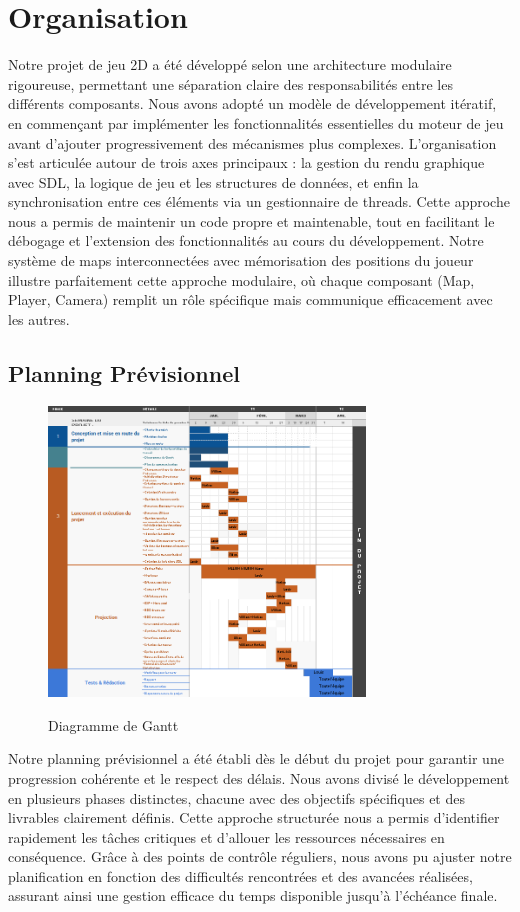 \documentclass[12pt,a4paper, twoside]{article}
\begin{document}
\section{Organisation}
Notre projet de jeu 2D a été développé selon une architecture modulaire rigoureuse, permettant une séparation claire des responsabilités entre les différents composants. Nous avons adopté un modèle de développement itératif, en commençant par implémenter les fonctionnalités essentielles du moteur de jeu avant d'ajouter progressivement des mécanismes plus complexes. L'organisation s'est articulée autour de trois axes principaux : la gestion du rendu graphique avec SDL, la logique de jeu et les structures de données, et enfin la synchronisation entre ces éléments via un gestionnaire de threads. Cette approche nous a permis de maintenir un code propre et maintenable, tout en facilitant le débogage et l'extension des fonctionnalités au cours du développement. Notre système de maps interconnectées avec mémorisation des positions du joueur illustre parfaitement cette approche modulaire, où chaque composant (Map, Player, Camera) remplit un rôle spécifique mais communique efficacement avec les autres.

\subsection{Planning Prévisionnel}
\begin{figure}[h]
    \centering
    \includegraphics[width=0.75\textwidth]{GANTT.png}
    \label{fig:GANTT}
    \caption{Diagramme de Gantt}
\end{figure}

Notre planning prévisionnel a été établi dès le début du projet pour garantir une progression cohérente et le respect des délais. Nous avons divisé le développement en plusieurs phases distinctes, chacune avec des objectifs spécifiques et des livrables clairement définis. Cette approche structurée nous a permis d'identifier rapidement les tâches critiques et d'allouer les ressources nécessaires en conséquence. Grâce à des points de contrôle réguliers, nous avons pu ajuster notre planification en fonction des difficultés rencontrées et des avancées réalisées, assurant ainsi une gestion efficace du temps disponible jusqu'à l'échéance finale.
\end{document}
